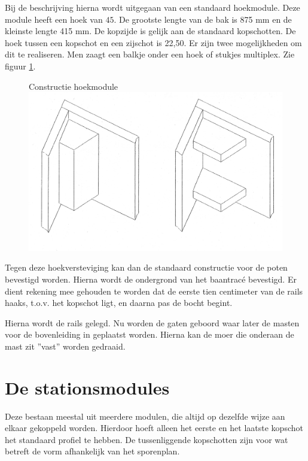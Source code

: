 \documentclass[12pt,a4paper]{report}
\newcommand*{\trace}{trac\'{e} }
\begin{document}
Bij de beschrijving hierna wordt uitgegaan van een standaard hoekmodule. Deze module heeft een hoek van $45$\textdegree. De grootste lengte van de bak is 875 mm en de kleinste lengte 415 mm. De kopzijde is gelijk aan de standaard kopschotten.
De hoek tussen een kopschot en een zijschot is 22,50. Er zijn twee mogelijkheden om dit te realiseren. Men zaagt een balkje onder een hoek of stukjes multiplex. Zie figuur \ref{figuur4}.

\begin{figure}[!ht]
  \captionbox
  {Constructie hoekmodule\label{figuur4}}
  {\includegraphics[scale=0.2]{images/rcu_figuur4}}
\end{figure}

Tegen deze hoekversteviging kan dan de standaard constructie voor de poten bevestigd worden. Hierna wordt de ondergrond van het baan\trace bevestigd. Er dient rekening mee gehouden te worden dat de eerste tien centimeter van de rails haaks, t.o.v. het kopschot ligt, en daarna pas de bocht begint. 

Hierna wordt de rails gelegd. Nu worden de gaten geboord waar later de masten voor de bovenleiding in geplaatst worden. 
Hierna kan de moer die onderaan de mast zit ''vast'' worden gedraaid.

\section{De stationsmodules}
Deze bestaan meestal uit meerdere modulen, die altijd op dezelfde wijze aan elkaar gekoppeld worden. Hierdoor hoeft alleen het eerste en het laatste kopschot het standaard profiel te hebben. De tussenliggende kopschotten zijn voor wat betreft de vorm afhankelijk van het sporenplan.
\end{document}
